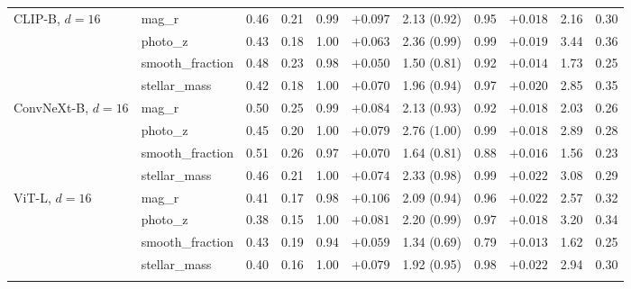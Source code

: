 \begin{tabular}{llccccccccc}
\addlinespace[2pt]
CLIP-B, $d=16$ & mag\_r & 0.46 & 0.21 & 0.99 & $+0.097$ & 2.13 (0.92) & 0.95 & $+0.018$ & 2.16 & 0.30 \\
 & photo\_z & 0.43 & 0.18 & 1.00 & $+0.063$ & 2.36 (0.99) & 0.99 & $+0.019$ & 3.44 & 0.36 \\
 & smooth\_fraction & 0.48 & 0.23 & 0.98 & $+0.050$ & 1.50 (0.81) & 0.92 & $+0.014$ & 1.73 & 0.25 \\
 & stellar\_mass & 0.42 & 0.18 & 1.00 & $+0.070$ & 1.96 (0.94) & 0.97 & $+0.020$ & 2.85 & 0.35 \\
\addlinespace[2pt]
ConvNeXt-B, $d=16$ & mag\_r & 0.50 & 0.25 & 0.99 & $+0.084$ & 2.13 (0.93) & 0.92 & $+0.018$ & 2.03 & 0.26 \\
 & photo\_z & 0.45 & 0.20 & 1.00 & $+0.079$ & 2.76 (1.00) & 0.99 & $+0.018$ & 2.89 & 0.28 \\
 & smooth\_fraction & 0.51 & 0.26 & 0.97 & $+0.070$ & 1.64 (0.81) & 0.88 & $+0.016$ & 1.56 & 0.23 \\
 & stellar\_mass & 0.46 & 0.21 & 1.00 & $+0.074$ & 2.33 (0.98) & 0.99 & $+0.022$ & 3.08 & 0.29 \\
\addlinespace[2pt]
ViT-L, $d=16$ & mag\_r & 0.41 & 0.17 & 0.98 & $+0.106$ & 2.09 (0.94) & 0.96 & $+0.022$ & 2.57 & 0.32 \\
 & photo\_z & 0.38 & 0.15 & 1.00 & $+0.081$ & 2.20 (0.99) & 0.97 & $+0.018$ & 3.20 & 0.34 \\
 & smooth\_fraction & 0.43 & 0.19 & 0.94 & $+0.059$ & 1.34 (0.69) & 0.79 & $+0.013$ & 1.62 & 0.25 \\
 & stellar\_mass & 0.40 & 0.16 & 1.00 & $+0.079$ & 1.92 (0.95) & 0.98 & $+0.022$ & 2.94 & 0.30 \\
\addlinespace[2pt]
\bottomrule
\end{tabular}
